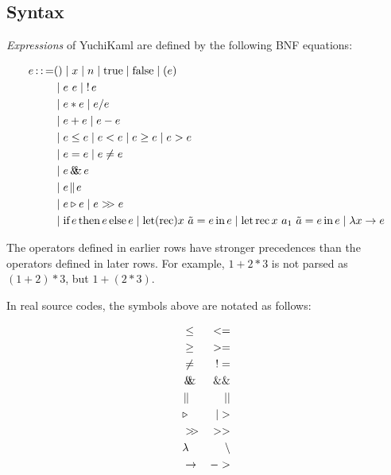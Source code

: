 \subsection{Syntax}

\emph{Expressions} of YuchiKaml are defined by the following BNF equations:

\begin{align*}
    e \defeq    & () \mid x \mid n \mid \trueToken \mid \falseToken \mid (e)\\
                &\mid e\ e \mid \logNot e\\
                &\mid e * e \mid e / e\\
                &\mid e + e \mid e - e\\
                &\mid e \leq e \mid e < e \mid e \geq e \mid e > e\\
                &\mid e = e \mid e \not= e\\
                &\mid e \logAnd e\\
                &\mid e \logOr e\\
                &\mid e \triangleright e \mid e \composition e\\
                &\mid \ifToken e \thenToken e \elseToken e \mid \letToken (\recToken) x\ \tilde{a} = e \inToken e \mid \letToken \recToken x\ a_1\ \tilde{a} = e \inToken e\mid \lambda x \rightarrow e
\end{align*}

The operators defined in earlier rows have stronger precedences than the operators defined in later rows.
For example, $1 + 2 * 3$ is not parsed as $(1 + 2) * 3$, but $1 + ( 2 * 3)$.

In real source codes, the symbols above are notated as follows:

\begin{align*}
    &\leq & <=\\
    &\geq & >=\\
    &\not= & !=\\
    &\logAnd & \&\&\\
    &\logOr & ||\\
    &\triangleright & |>\\
    &\composition & >>\\
    &\lambda & \backslash\\
    &\rightarrow & ->
\end{align*}
